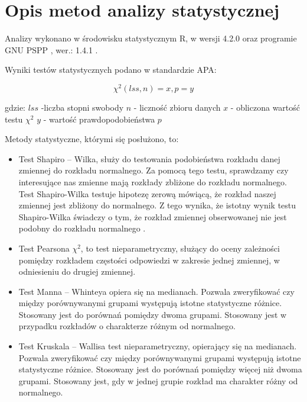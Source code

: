 \documentclass[a4paper,12pt,twoside,openany]{report}
\begin{document}
\section{Opis metod analizy statystycznej}

Analizy wykonano w środowisku statystycznym R, w wersji 4.2.0 \cite{rproject} oraz programie GNU PSPP , wer.: 1.4.1 \cite{gnupspp}. 

\vspace{\baselineskip} 

Wyniki testów statystycznych podano w standardzie APA\cite{apa}:\newline

\begin{equation}
    \chi^2 (lss, n) = x, p=y
\end{equation}

\vspace{\baselineskip} 
gdzie:\newline
$lss$ -liczba stopni swobody\newline
$n$ - liczność zbioru danych\newline
$x$ - obliczona wartość testu $\chi^2$\newline
$y$ - wartość prawdopodobieństwa $p$\newline


Metody statystyczne, którymi się posłużono, to:
\begin{itemize}
     \item Test Shapiro – Wilka, służy do testowania podobieństwa rozkładu danej zmiennej do rozkładu normalnego. Za pomocą tego testu, sprawdzamy czy interesujące nas zmienne mają rozkłady zbliżone do rozkładu normalnego. Test Shapiro-Wilka testuje hipotezę zerową mówiącą, że rozkład naszej zmiennej jest zbliżony do normalnego. Z tego wynika, że istotny wynik testu Shapiro-Wilka świadczy o tym, że rozkład zmiennej obserwowanej nie jest podobny do rozkładu normalnego \cite{ShapWilk}. 
    
     \item Test Pearsona $\chi^2$, to test nieparametryczny, służący do oceny zależności pomiędzy rozkładem częstości odpowiedzi w zakresie jednej zmiennej, w odniesieniu do drugiej zmiennej.
     
     \item Test Manna – Whinteya opiera się na medianach. Pozwala zweryfikować czy między porównywanymi grupami występują istotne statystyczne różnice. Stosowany jest do porównań pomiędzy dwoma grupami. Stosowany jest w przypadku rozkładów o charakterze różnym od normalnego.
    
     \item Test Kruskala – Wallisa test nieparametryczny, opierający się na medianach. Pozwala zweryfikować czy między porównywanymi grupami występują istotne statystyczne różnice. Stosowany jest do porównań pomiędzy więcej niż dwoma grupami. Stosowany jest, gdy w jednej grupie rozkład ma charakter różny od normalnego.
     
     

\end{itemize}
\end{document}
